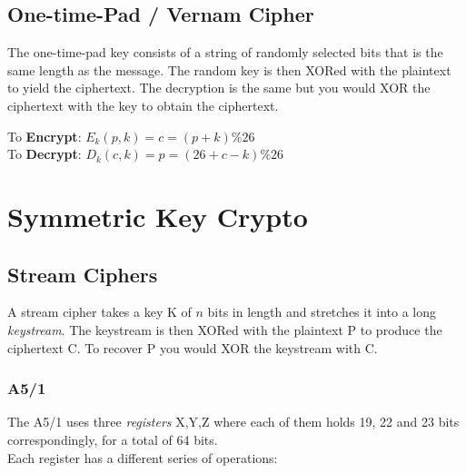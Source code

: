 \documentclass{article}
\begin{document}
\subsection{One-time-Pad / Vernam Cipher}
The one-time-pad key consists of a string of randomly selected bits that is the same length as the message. The random key is then XORed with the plaintext to yield the ciphertext. The decryption is the same but you would XOR the ciphertext with the key to obtain the ciphertext.
\begin{center}
    \justify
    To \textbf{Encrypt}: $E_k(p,k) = c = (p + k) \% 26$\\
    To \textbf{Decrypt}: $D_k(c,k) = p = (26 + c - k) \% 26$
\end{center}

\newpage
\section{Symmetric Key Crypto}

\subsection{Stream Ciphers}
A stream cipher takes a key K of $n$ bits in length and stretches it into a long \textit{keystream}. The keystream is then XORed with the plaintext P to produce the ciphertext C. To recover P you would XOR the keystream with C.

\subsubsection{A5/1}
The A5/1 uses three \textit{registers} X,Y,Z where each of them holds 19, 22 and 23 bits correspondingly, for a total of 64 bits.\\
Each register has a different series of operations:
\end{document}
